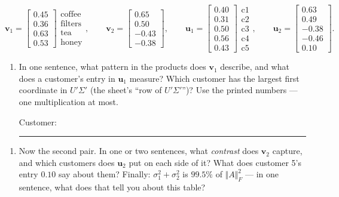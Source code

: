 \documentclass[
  11pt,
]{article}
\providecommand{\tightlist}{%
  \setlength{\itemsep}{0pt}\setlength{\parskip}{0pt}}
\newcommand{\answerspace}[1]{\par\vspace*{#1}}  %
\newcommand{\blank}[1][1.2in]{\rule{#1}{0.4pt}}
\begin{document}
\[
\mathbf v_1 = \begin{bmatrix}0.45\\0.36\\0.63\\0.53\end{bmatrix}
\begin{matrix}\text{coffee}\\\text{filters}\\\text{tea}\\\text{honey}\end{matrix},
\qquad
\mathbf v_2 = \begin{bmatrix}0.65\\0.50\\-0.43\\-0.38\end{bmatrix},
\qquad
\mathbf u_1 = \begin{bmatrix}0.40\\0.31\\0.50\\0.56\\0.43\end{bmatrix}
\begin{matrix}\text{c1}\\\text{c2}\\\text{c3}\\\text{c4}\\\text{c5}\end{matrix},
\qquad
\mathbf u_2 = \begin{bmatrix}0.63\\0.49\\-0.38\\-0.46\\0.10\end{bmatrix}.
\]

\begin{enumerate}
\def\labelenumi{(\alph{enumi})}
\item
  In one sentence, what pattern in the products does \(\mathbf v_1\)
  describe, and what does a customer's entry in \(\mathbf u_1\) measure?
  Which customer has the largest first coordinate in \(U'\Sigma'\) (the
  sheet's ``row of \(U'\Sigma'\)'')? Use the printed numbers --- one
  multiplication at most.

  Customer: \blank[0.8in]
\end{enumerate}

\answerspace{1.2in}

\begin{enumerate}
\def\labelenumi{(\alph{enumi})}
\setcounter{enumi}{1}
\tightlist
\item
  Now the second pair. In one or two sentences, what \emph{contrast}
  does \(\mathbf v_2\) capture, and which customers does \(\mathbf u_2\)
  put on each side of it? What does customer 5's entry \(0.10\) say
  about them? Finally: \(\sigma_1^2+\sigma_2^2\) is \(99.5\%\) of
  \(\Vert A\Vert_F^2\) --- in one sentence, what does that tell you
  about this table?
\end{enumerate}
\end{document}
